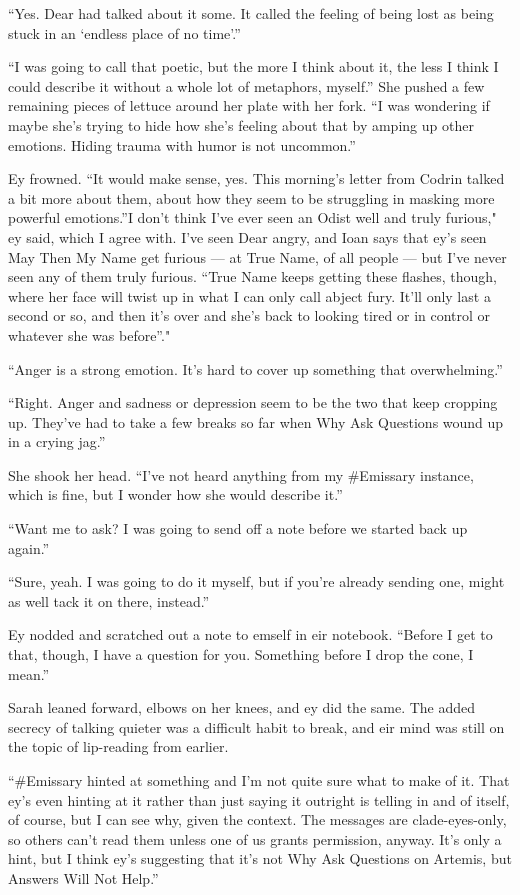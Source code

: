 ``Yes. Dear had talked about it some. It called the feeling of being lost as being stuck in an `endless place of no time'.''

``I was going to call that poetic, but the more I think about it, the less I think I could describe it without a whole lot of metaphors, myself.'' She pushed a few remaining pieces of lettuce around her plate with her fork. ``I was wondering if maybe she's trying to hide how she's feeling about that by amping up other emotions. Hiding trauma with humor is not uncommon.''

Ey frowned. ``It would make sense, yes. This morning's letter from Codrin talked a bit more about them, about how they seem to be struggling in masking more powerful emotions.''I don't think I've ever seen an Odist well and truly furious," ey said, which I agree with. I've seen Dear angry, and Ioan says that ey's seen May Then My Name get furious — at True Name, of all people — but I've never seen any of them truly furious. ``True Name keeps getting these flashes, though, where her face will twist up in what I can only call abject fury. It'll only last a second or so, and then it's over and she's back to looking tired or in control or whatever she was before''."

``Anger is a strong emotion. It's hard to cover up something that overwhelming.''

``Right. Anger and sadness or depression seem to be the two that keep cropping up. They've had to take a few breaks so far when Why Ask Questions wound up in a crying jag.''

She shook her head. ``I've not heard anything from my \#Emissary instance, which is fine, but I wonder how she would describe it.''

``Want me to ask? I was going to send off a note before we started back up again.''

``Sure, yeah. I was going to do it myself, but if you're already sending one, might as well tack it on there, instead.''

Ey nodded and scratched out a note to emself in eir notebook. ``Before I get to that, though, I have a question for you. Something before I drop the cone, I mean.''

Sarah leaned forward, elbows on her knees, and ey did the same. The added secrecy of talking quieter was a difficult habit to break, and eir mind was still on the topic of lip-reading from earlier.

``\#Emissary hinted at something and I'm not quite sure what to make of it. That ey's even hinting at it rather than just saying it outright is telling in and of itself, of course, but I can see why, given the context. The messages are clade-eyes-only, so others can't read them unless one of us grants permission, anyway. It's only a hint, but I think ey's suggesting that it's not Why Ask Questions on Artemis, but Answers Will Not Help.''

